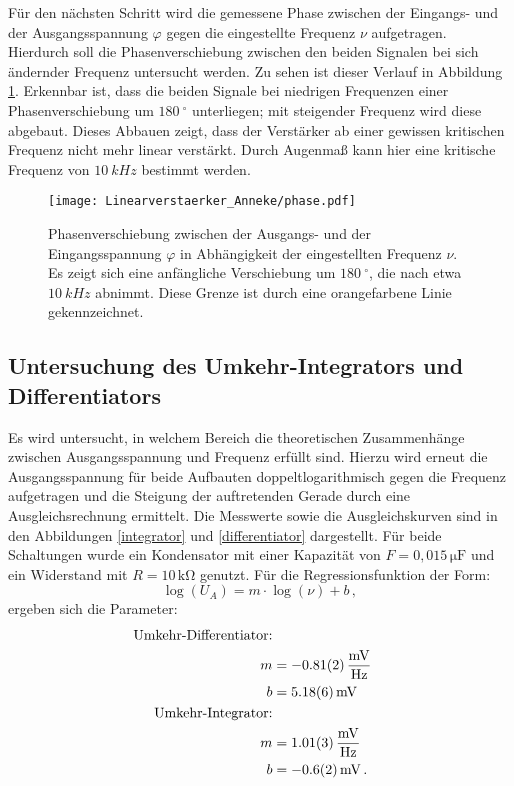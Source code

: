 \clearpage
Für den nächsten Schritt wird die gemessene Phase zwischen der Eingangs- und der Ausgangsspannung $\varphi$ gegen die eingestellte Frequenz $\nu$ aufgetragen. Hierdurch soll die Phasenverschiebung zwischen den beiden Signalen bei sich ändernder Frequenz untersucht werden. Zu sehen ist dieser Verlauf in Abbildung \ref{phase}.
Erkennbar ist, dass die beiden Signale bei niedrigen Frequenzen einer Phasenverschiebung um $\SI{180}{^\circ}$ unterliegen; mit steigender Frequenz wird diese abgebaut. Dieses Abbauen zeigt, dass der Verstärker ab einer gewissen kritischen Frequenz nicht mehr linear verstärkt.
Durch Augenmaß kann hier eine kritische Frequenz von $\SI{10}{kHz}$ bestimmt werden.
\begin{figure}[h]
  \centering
  \texttt{[image: Linearverstaerker\_Anneke/phase.pdf]}
  \caption{Phasenverschiebung zwischen der Ausgangs- und der Eingangsspannung $\varphi$ in Abhängigkeit der eingestellten Frequenz $\nu$. Es zeigt sich eine anfängliche Verschiebung um $\SI{180}{^\circ}$, die nach etwa $\SI{10}{kHz}$ abnimmt. Diese Grenze ist durch eine orangefarbene Linie gekennzeichnet.}
  \label{phase}
\end{figure}

\subsection{Untersuchung des Umkehr-Integrators und Differentiators}
Es wird untersucht, in welchem Bereich die theoretischen Zusammenhänge zwischen Ausgangsspannung und Frequenz erfüllt sind. Hierzu wird erneut die Ausgangsspannung für beide Aufbauten doppeltlogarithmisch gegen die Frequenz aufgetragen und die Steigung der auftretenden Gerade durch eine Ausgleichsrechnung ermittelt. Die Messwerte sowie die Ausgleichskurven sind in den Abbildungen \ref{integrator} und \ref{differentiator} dargestellt. Für beide Schaltungen wurde ein Kondensator mit einer Kapazität von $F=0{,}015\,\si{\micro\farad}$ und ein Widerstand mit $R=10\,\si{\kilo\ohm}$ genutzt. Für die Regressionsfunktion der Form:
\begin{equation}
\log(U_A)=m\cdot\log(\nu)+b\,,
\end{equation}
ergeben sich die Parameter:
\begin{align*}
\text{Umkehr-Differentiator:}\\
m&=\SI{-0,81\pm0,02}{\frac{mV}{Hz}}\\
b&=\SI{5,18\pm0,06}{mV}\\
\text{Umkehr-Integrator:}\\
m&=\SI{1,01\pm0,03}{\frac{mV}{Hz}}\\
b&=\SI{-0,6\pm0,2}{mV}\,.\\
\end{align*}

